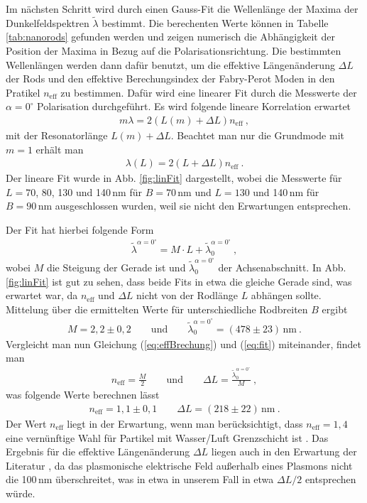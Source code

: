 Im nächsten Schritt wird durch einen Gauss-Fit die Wellenlänge der Maxima der Dunkelfeldspektren $\tilde{\lambda}$ bestimmt. Die berechenten Werte können in Tabelle \ref{tab:nanorods} gefunden werden und zeigen numerisch die Abhängigkeit der Position der Maxima in Bezug auf die Polarisationsrichtung. Die bestimmten Wellenlängen werden dann dafür benutzt, um die effektive Längenänderung $\Delta L$ der Rods und den effektive Berechungsindex der Fabry-Perot Moden in den Pratikel $n_\mathrm{eff}$ zu bestimmen. Dafür wird eine linearer Fit durch die Messwerte der $\alpha = 0^\circ$ Polarisation durchgeführt. Es wird folgende lineare Korrelation erwartet
\begin{gather}
    m\lambda = 2 (L(m) + \Delta L)n_\mathrm{eff}~,
\end{gather}
mit der Resonatorlänge $L(m) + \Delta L$. \cite{Anleitung} Beachtet man nur die Grundmode mit $m = 1$ erhält man
\begin{gather}
    \lambda(L) = 2 ( L + \Delta L) n_\mathrm{eff}~.
    \label{eq:effBrechung}
\end{gather}
Der lineare Fit wurde in Abb. \ref{fig:linFit} dargestellt, wobei die Messwerte für $L = 70$, 80, 130 und 140\,nm für $B = 70\,\mathrm{nm}$ und $L = 130$ und 140\,nm für $B = 90\,\mathrm{nm}$ ausgeschlossen wurden, weil sie nicht den Erwartungen entsprechen. 

Der Fit hat hierbei folgende Form
\begin{gather}
    \tilde{\lambda}^{\alpha = 0^\circ} = M \cdot L + \tilde{\lambda}^{\alpha = 0^\circ}_0~,
    \label{eq:fit}
\end{gather}
wobei $M$ die Steigung der Gerade ist und $\tilde{\lambda}^{\alpha = 0^\circ}_0$ der Achsenabschnitt. In Abb. \ref{fig:linFit} ist gut zu sehen, dass beide Fits in etwa die gleiche Gerade sind, was erwartet war, da $n_\mathrm{eff}$ und $\Delta L$ nicht von der Rodlänge $L$ abhängen sollte. Mittelung über die ermittelten Werte für unterschiedliche Rodbreiten $B$ ergibt
\begin{gather*}
    M = 2,2 \pm 0,2 \qquad \mathrm{und} \qquad \tilde{\lambda}^{\alpha = 0^\circ}_0 = (478 \pm 23)\,\mathrm{nm}~.
\end{gather*}
Vergleicht man nun Gleichung (\ref{eq:effBrechung}) und (\ref{eq:fit}) miteinander, findet man
\begin{gather}
    n_\mathrm{eff} = \frac{M}{2} \qquad \mathrm{und} \qquad \Delta L = \frac{\tilde{\lambda}^{\alpha = 0^\circ}_0}{M}~,
\end{gather}
was folgende Werte berechnen lässt
\begin{gather*}
    \boxed{n_\mathrm{eff} = 1,1 \pm 0,1 \qquad \Delta L = (218 \pm 22)\,\mathrm{nm}}~.
\end{gather*}
Der Wert $n_\mathrm{eff}$ liegt in der Erwartung, wenn man berücksichtigt, dass  $n_\mathrm{eff} = 1,4$ eine vernünftige Wahl für Partikel mit Wasser/Luft Grenzschicht ist \cite{Anleitung}. Das Ergebnis für die effektive Längenänderung $\Delta L$ liegen auch in den Erwartung der Literatur , da das plasmonische elektrische Feld außerhalb eines Plasmons nicht die 100\,nm überschreitet, was in etwa in unserem Fall in etwa $\Delta L /2$ entsprechen würde.  
\newpage

